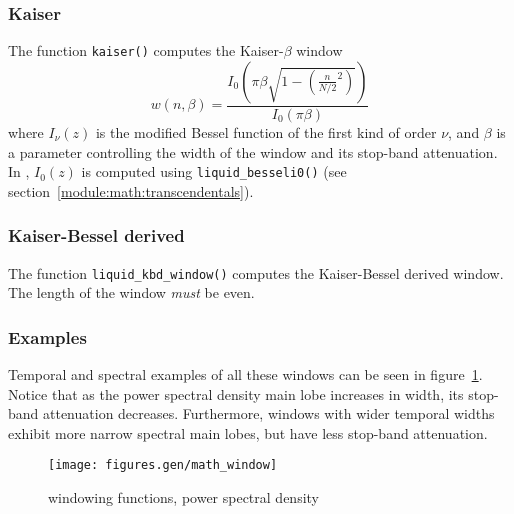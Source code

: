 \subsubsection{Kaiser}
\label{module:math:window:kaiser}
The function {\tt kaiser()} computes the Kaiser-$\beta$ window
%
\begin{equation}
\label{eqn:math:window:kaiser}
    w(n,\beta) = \frac{
        I_0\left(\pi\beta\sqrt{1-\left(\frac{n}{N/2}^2\right)}\right)
    }{
        I_0\left(\pi\beta\right)
    }
\end{equation}
%
where $I_\nu(z)$ is the modified Bessel function of the first kind of
order $\nu$, and $\beta$ is a parameter controlling the width of the
window and its stop-band attenuation.
In \liquid, $I_0(z)$ is computed using {\tt liquid\_besseli0()} (see
section~\ref{module:math:transcendentals}).

\subsubsection{Kaiser-Bessel derived}
\label{module:math:window:kbd}
The function {\tt liquid\_kbd\_window()}
computes the Kaiser-Bessel derived window.
The length of the window {\em must} be even.

\subsubsection{Examples}
\label{module:math:window:examples}

Temporal and spectral examples of all these windows can be seen in
figure~\ref{fig:module:math:window}.
Notice that as the power spectral density main lobe increases in width, its
stop-band attenuation decreases.
Furthermore, windows with wider temporal widths exhibit more narrow spectral
main lobes, but have less stop-band attenuation.

\begin{figure}
\centering
  \texttt{[image: figures.gen/math\_window]}
\caption{windowing functions, power spectral density}
\label{fig:module:math:window}
\end{figure}

